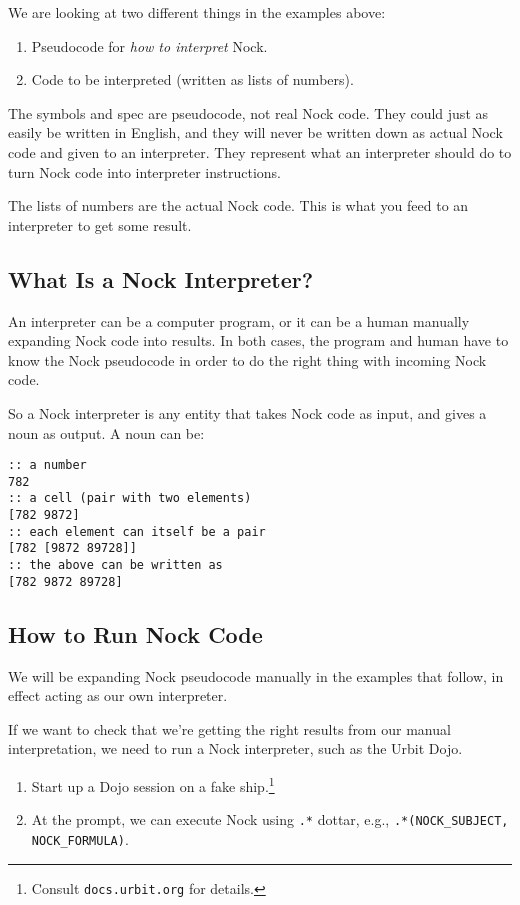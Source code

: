 \documentclass[twoside]{article}
\begin{document}
We are looking at two different things in the examples above:

\begin{enumerate}
  \item  Pseudocode for \emph{how to interpret} Nock.
  \item  Code to be interpreted (written as lists of numbers).
\end{enumerate}

The symbols and spec are pseudocode, not real Nock code. They could just as easily be written in English, and they will never be written down as actual Nock code and given to an interpreter. They represent what an interpreter should do to turn Nock code into interpreter instructions.

The lists of numbers are the actual Nock code. This is what you feed to an interpreter to get some result.

\subsection{What Is a Nock Interpreter?}

An interpreter can be a computer program, or it can be a human manually expanding Nock code into results. In both cases, the program and human have to know the Nock pseudocode in order to do the right thing with incoming Nock code.

So a Nock interpreter is any entity that takes Nock code as input, and gives a noun as output. A noun can be:

\begin{lstlisting}[style=listingcode]
:: a number
782
:: a cell (pair with two elements)
[782 9872]
:: each element can itself be a pair
[782 [9872 89728]]
:: the above can be written as
[782 9872 89728]
\end{lstlisting}

\subsection{How to Run Nock Code}

We will be expanding Nock pseudocode manually in the examples that follow, in effect acting as our own interpreter.

If we want to check that we're getting the right results from our manual interpretation, we need to run a Nock interpreter, such as the Urbit Dojo.

\begin{enumerate}
  \item  Start up a Dojo session on a fake ship.\footnote{Consult \texttt{docs.urbit.org} for details.}
  \item  At the prompt, we can execute Nock using \texttt{.*} dottar, e.g., \lstinline[style=inlinecode]{.*(NOCK_SUBJECT, NOCK_FORMULA)}.
\end{enumerate}
\end{document}
